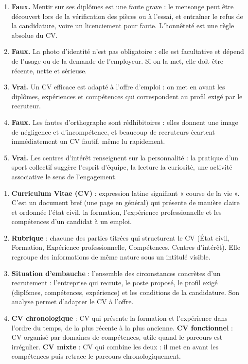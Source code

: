 \documentclass[11pt]{article}
\newcommand{\cle}[1]{{\popxbold\color{popdark}#1}}
\begin{document}
\begin{corrige}
\begin{enumerate}
\item \textbf{Faux.} Mentir sur ses diplômes est une faute grave : le mensonge peut être découvert lors de la vérification des pièces ou à l'essai, et entraîner le refus de la candidature, voire un licenciement pour faute. L'honnêteté est une règle absolue du \cle{CV}.
\item \textbf{Faux.} La photo d'identité n'est pas obligatoire : elle est facultative et dépend de l'usage ou de la demande de l'employeur. Si on la met, elle doit être récente, nette et sérieuse.
\item \textbf{Vrai.} Un \cle{CV} efficace est adapté à l'offre d'emploi : on met en avant les diplômes, expériences et compétences qui correspondent au profil exigé par le recruteur.
\item \textbf{Faux.} Les fautes d'orthographe sont rédhibitoires : elles donnent une image de négligence et d'incompétence, et beaucoup de recruteurs écartent immédiatement un \cle{CV} fautif, même lu rapidement.
\item \textbf{Vrai.} Les centres d'intérêt renseignent sur la personnalité : la pratique d'un sport collectif suggère l'esprit d'équipe, la lecture la curiosité, une activité associative le sens de l'engagement.
\end{enumerate}
\end{corrige}

\begin{corrige}
\begin{enumerate}
\item \textbf{\cle{Curriculum Vitae (CV)}} : expression latine signifiant « course de la vie ». C'est un document bref (une page en général) qui présente de manière claire et ordonnée l'état civil, la formation, l'expérience professionnelle et les compétences d'un candidat à un emploi.
\item \textbf{\cle{Rubrique}} : chacune des parties titrées qui structurent le \cle{CV} (État civil, Formation, Expérience professionnelle, Compétences, Centres d'intérêt). Elle regroupe des informations de même nature sous un intitulé visible.
\item \textbf{\cle{Situation d'embauche}} : l'ensemble des circonstances concrètes d'un recrutement : l'entreprise qui recrute, le poste proposé, le profil exigé (diplômes, compétences, expérience) et les conditions de la candidature. Son analyse permet d'adapter le \cle{CV} à l'offre.
\item \textbf{\cle{CV chronologique}} : \cle{CV} qui présente la formation et l'expérience dans l'ordre du temps, de la plus récente à la plus ancienne. \textbf{\cle{CV fonctionnel}} : \cle{CV} organisé par domaines de compétences, utile quand le parcours est irrégulier. \textbf{\cle{CV mixte}} : \cle{CV} qui combine les deux : il met en avant les compétences puis retrace le parcours chronologiquement.
\end{enumerate}
\end{corrige}
\end{document}
